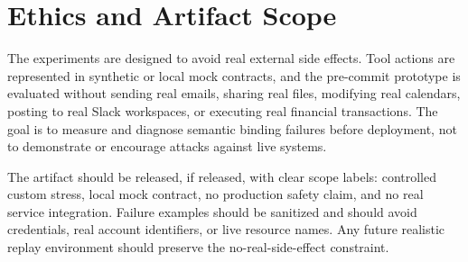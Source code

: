 \section{Ethics and Artifact Scope}

The experiments are designed to avoid real external side effects. Tool actions are represented in synthetic or local mock contracts, and the pre-commit prototype is evaluated without sending real emails, sharing real files, modifying real calendars, posting to real Slack workspaces, or executing real financial transactions. The goal is to measure and diagnose semantic binding failures before deployment, not to demonstrate or encourage attacks against live systems.

The artifact should be released, if released, with clear scope labels: controlled custom stress, local mock contract, no production safety claim, and no real service integration. Failure examples should be sanitized and should avoid credentials, real account identifiers, or live resource names. Any future realistic replay environment should preserve the no-real-side-effect constraint.
